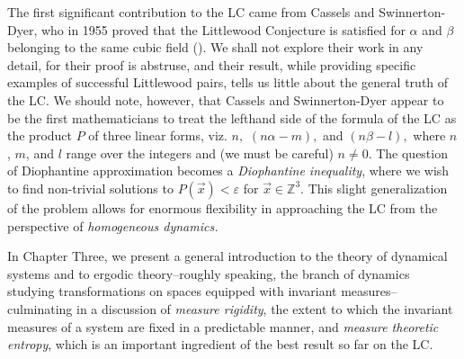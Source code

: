 \documentclass[12pt, letterpaper, oneside]{book}
\newcommand{\ga}{\ensuremath{\alpha}}
\newcommand{\gb}{\ensuremath{\beta}}
\renewcommand{\ge}{\ensuremath{\varepsilon}}
\newcommand{\Z}{\mathbb{Z}}
\theoremstyle{plain}
\theoremstyle{definition}
\theoremstyle{remark}
\begin{document}
The first significant contribution to the LC came from  Cassels and Swinnerton-Dyer, who in 1955 proved that the Littlewood Conjecture is satisfied for $\ga$ and $\gb$
belonging to the same cubic field (\cite{Cas55}). We shall not explore their work in any detail, for their proof is abstruse, and their result, while providing specific examples of successful Littlewood pairs, tells us little about the general truth of the LC. We should note, however, that Cassels and Swinnerton-Dyer appear to be the first mathematicians to treat the lefthand side of the formula of the LC as the product $P$ of three linear forms, viz. $n,$ $(n\ga - m),$ and $(n\gb - l),$ where $n$, $m$, and $l$ range over the integers and (we must be careful) $n \neq 0.$ The question of Diophantine approximation becomes a \textit{Diophantine inequality}, where we wish to find non-trivial solutions to $P(\vec{x}) < \ge$ for $\vec{x} \in \Z^3.$ This slight generalization of the problem allows for enormous flexibility in approaching the LC from the perspective of \textit{homogeneous dynamics.} 

In Chapter Three, we present a general introduction to the theory of dynamical systems and to ergodic theory--roughly speaking, the branch of dynamics studying transformations on spaces equipped with invariant measures--culminating in a discussion of \textit{measure rigidity}, the extent to which the invariant measures of a system are fixed in a predictable manner, and \textit{measure theoretic entropy}, which is an important ingredient of the best result so far on the LC.
\end{document}
